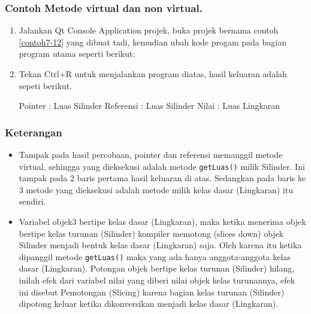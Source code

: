 \subsubsection*{Contoh Metode virtual dan non virtual.}

\begin{enumerate}

\item Jalankan Qt Console Application projek, buka projek bernama contoh \ref{contoh7-12}
yang dibuat tadi, kemudian ubah kode progam pada bagian program utama
seperti berikut:




\item Tekan Ctrl+R untuk menjalankan program diatas, hasil keluaran adalah
sepeti berikut.

\begin{lcverbatim}
Pointer : Luas Silinder
Referensi : Luas Silinder
Nilai : Luas Lingkaran
\end{lcverbatim}

\end{enumerate}

\subsubsection*{Keterangan}

\begin{itemize}

\item
 Tampak pada hasil percobaan, pointer dan referensi memanggil metode
 virtual, sehingga yang dieksekusi adalah metode \texttt{getLuas()}
 milik Silinder. Ini tampak pada 2 baris pertama hasil keluaran di
 atas. Sedangkan pada baris ke 3 metode yang dieksekusi adalah metode
 milik kelas dasar (Lingkaran) itu sendiri.
\item
 Variabel objek3 bertipe kelas dasar (Lingkaran), maka ketika menerima
 objek bertipe kelas turunan (Silinder) kompiler memotong (slices down)
 objek Silinder menjadi bentuk kelas dasar (Lingkaran) saja. Oleh
 karena itu ketika dipanggil metode \texttt{getLuas()} maka yang ada
 hanya anggota-anggota kelas dasar (Lingkaran). Potongan objek bertipe
 kelas turunan (Silinder) hilang, inilah efek dari variabel nilai yang
 diberi nilai objek kelas turunannya, efek ini disebut Pemotongan
 (Slicing) karena bagian kelas turunan (Silinder) dipotong keluar
 ketika dikonversikan menjadi kelas dasar (Lingkaran).
\end{itemize}

